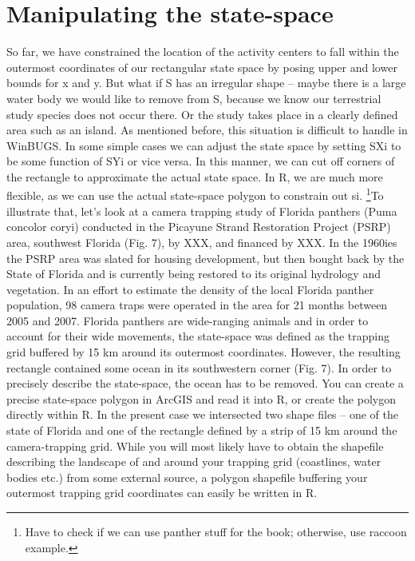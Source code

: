 \section{Manipulating the state-space}
So far, we have constrained the location of the activity centers to fall within the outermost coordinates of our rectangular state space by posing upper and lower bounds for x and y. But what if S has an irregular shape – maybe there is a large water body we would like to remove from S, because we know our terrestrial study species does not occur there. Or the study takes place in a clearly defined area such as an island. As mentioned before, this situation is difficult to handle in WinBUGS. In some simple cases we can adjust the state space by setting SXi to be some function of SYi or vice versa. In this manner, we can cut off corners of the rectangle to approximate the actual state space. In R, we are much more flexible, as we can use the actual state-space polygon to constrain out si. \footnote{ Have to check if we can use panther stuff for the book; otherwise, use raccoon example.}To illustrate that, let's look at a camera trapping study of Florida panthers (Puma concolor coryi) conducted in the Picayune Strand Restoration Project (PSRP) area, southwest Florida (Fig. 7), by XXX, and financed by XXX. In the 1960ies the PSRP area was slated for housing development, but then bought back by the State of Florida and is currently being restored to its original hydrology and vegetation. In an effort to estimate the density of the local Florida panther population, 98 camera traps were operated in the area for 21 months between 2005 and 2007. Florida panthers are wide-ranging animals and in order to account for their wide movements, the state-space was defined as the trapping grid buffered by 15 km around its outermost coordinates. However, the resulting rectangle contained some ocean in its southwestern corner (Fig. 7).
In order to precisely describe the state-space, the ocean has to be removed. You can create a precise state-space polygon in ArcGIS and read it into R, or create the polygon directly within R. In the present case we intersected two shape files – one of the state of Florida and one of the rectangle defined by a strip of 15 km around the camera-trapping grid.
While you will most likely have to obtain the shapefile describing the landscape of and around your trapping grid (coastlines, water bodies etc.) from some external source, a polygon shapefile buffering your outermost trapping grid coordinates can easily be written in R.

